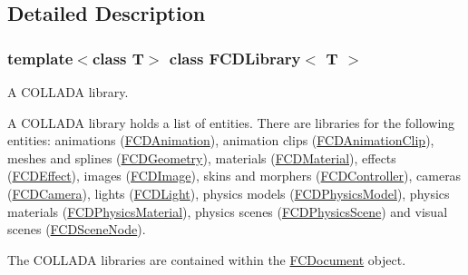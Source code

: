 \subsection{Detailed Description}
\subsubsection*{template$<$class T$>$ class FCDLibrary$<$ T $>$}

A COLLADA library.

A COLLADA library holds a list of entities. There are libraries for the following entities: animations (\hyperlink{classFCDAnimation}{FCDAnimation}), animation clips (\hyperlink{classFCDAnimationClip}{FCDAnimationClip}), meshes and splines (\hyperlink{classFCDGeometry}{FCDGeometry}), materials (\hyperlink{classFCDMaterial}{FCDMaterial}), effects (\hyperlink{classFCDEffect}{FCDEffect}), images (\hyperlink{classFCDImage}{FCDImage}), skins and morphers (\hyperlink{classFCDController}{FCDController}), cameras (\hyperlink{classFCDCamera}{FCDCamera}), lights (\hyperlink{classFCDLight}{FCDLight}), physics models (\hyperlink{classFCDPhysicsModel}{FCDPhysicsModel}), physics materials (\hyperlink{classFCDPhysicsMaterial}{FCDPhysicsMaterial}), physics scenes (\hyperlink{classFCDPhysicsScene}{FCDPhysicsScene}) and visual scenes (\hyperlink{classFCDSceneNode}{FCDSceneNode}).

The COLLADA libraries are contained within the \hyperlink{classFCDocument}{FCDocument} object. 

